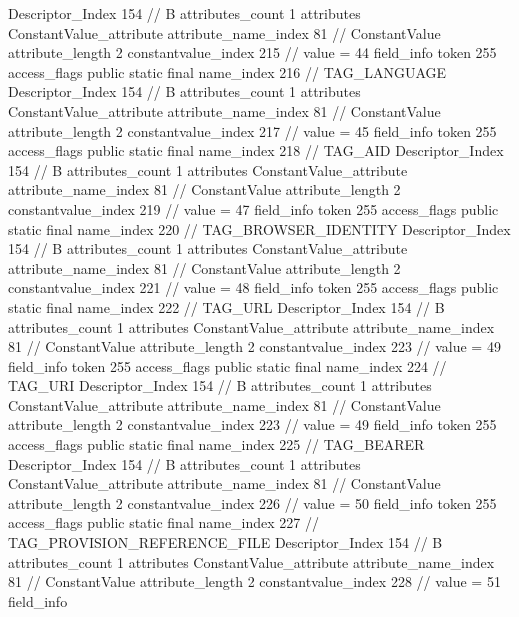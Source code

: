 {{{{{				Descriptor_Index	154		// B
				attributes_count	1
				attributes {
				ConstantValue_attribute {
					attribute_name_index	81		// ConstantValue
					attribute_length	2
					constantvalue_index	215		// value = 44
				}
				}
			}
			field_info {
				token	255
				access_flags	public static final
				name_index	216		// TAG_LANGUAGE
				Descriptor_Index	154		// B
				attributes_count	1
				attributes {
				ConstantValue_attribute {
					attribute_name_index	81		// ConstantValue
					attribute_length	2
					constantvalue_index	217		// value = 45
				}
				}
			}
			field_info {
				token	255
				access_flags	public static final
				name_index	218		// TAG_AID
				Descriptor_Index	154		// B
				attributes_count	1
				attributes {
				ConstantValue_attribute {
					attribute_name_index	81		// ConstantValue
					attribute_length	2
					constantvalue_index	219		// value = 47
				}
				}
			}
			field_info {
				token	255
				access_flags	public static final
				name_index	220		// TAG_BROWSER_IDENTITY
				Descriptor_Index	154		// B
				attributes_count	1
				attributes {
				ConstantValue_attribute {
					attribute_name_index	81		// ConstantValue
					attribute_length	2
					constantvalue_index	221		// value = 48
				}
				}
			}
			field_info {
				token	255
				access_flags	public static final
				name_index	222		// TAG_URL
				Descriptor_Index	154		// B
				attributes_count	1
				attributes {
				ConstantValue_attribute {
					attribute_name_index	81		// ConstantValue
					attribute_length	2
					constantvalue_index	223		// value = 49
				}
				}
			}
			field_info {
				token	255
				access_flags	public static final
				name_index	224		// TAG_URI
				Descriptor_Index	154		// B
				attributes_count	1
				attributes {
				ConstantValue_attribute {
					attribute_name_index	81		// ConstantValue
					attribute_length	2
					constantvalue_index	223		// value = 49
				}
				}
			}
			field_info {
				token	255
				access_flags	public static final
				name_index	225		// TAG_BEARER
				Descriptor_Index	154		// B
				attributes_count	1
				attributes {
				ConstantValue_attribute {
					attribute_name_index	81		// ConstantValue
					attribute_length	2
					constantvalue_index	226		// value = 50
				}
				}
			}
			field_info {
				token	255
				access_flags	public static final
				name_index	227		// TAG_PROVISION_REFERENCE_FILE
				Descriptor_Index	154		// B
				attributes_count	1
				attributes {
				ConstantValue_attribute {
					attribute_name_index	81		// ConstantValue
					attribute_length	2
					constantvalue_index	228		// value = 51
				}
				}
			}
			field_info {
}}}}}
